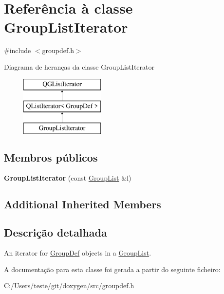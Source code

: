 \hypertarget{class_group_list_iterator}{\section{Referência à classe Group\-List\-Iterator}
\label{class_group_list_iterator}
}


{\ttfamily \#include $<$groupdef.\-h$>$}

Diagrama de heranças da classe Group\-List\-Iterator\begin{figure}[H]
\begin{center}
\leavevmode
\includegraphics[height=3.000000cm]{class_group_list_iterator}
\end{center}
\end{figure}
\subsection*{Membros públicos}
\begin{DoxyCompactItemize}
\item 
\hypertarget{class_group_list_iterator_ab1913a5c06252bd7e30f4785709aeef9}{{\bfseries Group\-List\-Iterator} (const \hyperlink{class_group_list}{Group\-List} \&l)}\label{class_group_list_iterator_ab1913a5c06252bd7e30f4785709aeef9}

\end{DoxyCompactItemize}
\subsection*{Additional Inherited Members}


\subsection{Descrição detalhada}
An iterator for \hyperlink{class_group_def}{Group\-Def} objects in a \hyperlink{class_group_list}{Group\-List}. 

A documentação para esta classe foi gerada a partir do seguinte ficheiro\-:\begin{DoxyCompactItemize}
\item 
C\-:/\-Users/teste/git/doxygen/src/groupdef.\-h\end{DoxyCompactItemize}
